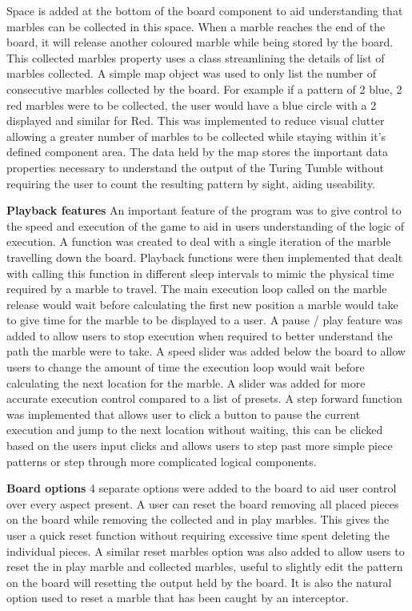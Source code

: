 \documentclass{l4proj}
\begin{document}
Space is added at the bottom of the board component to aid understanding that marbles can be collected in this space. When a marble reaches the end of the board, it will release another coloured marble while being stored by the board. This collected marbles property uses a class streamlining the details of list of marbles collected. A simple map object was used to only list the number of consecutive marbles collected by the board. For example if a pattern of 2 blue, 2 red marbles were to be collected, the user would have a blue circle with a 2 displayed and similar for Red. This was implemented to reduce visual clutter allowing a greater number of marbles to be collected while staying within it's defined component area. The data held by the map stores the important data properties necessary to understand the output of the Turing Tumble without requiring the user to count the resulting pattern by sight, aiding useability.   

\textbf{Playback features}
An important feature of the program was to give control to the speed and execution of the game to aid in users understanding of the logic of execution. A function was created to deal with a single iteration of the marble travelling down the board. Playback functions were then implemented that dealt with calling this function in different sleep intervals to mimic the physical time required by a marble to travel. The main execution loop called on the marble release would wait before calculating the first new position a marble would take to give time for the marble to be displayed to a user. A pause / play feature was added to allow users to stop execution when required to better understand the path the marble were to take. A speed slider was added below the board to allow users to change the amount of time the execution loop would wait before calculating the next location for the marble. A slider was added for more accurate execution control compared to a list of presets. A step forward function was implemented that allows user to click a button to pause the current execution and jump to the next location without waiting, this can be clicked based on the users input clicks and allows users to step past more simple piece patterns or step through more complicated logical components. 

\textbf{Board options}
4 separate options were added to the board to aid user control over every aspect present. A user can reset the board removing all placed pieces on the board while removing the collected and in play marbles. This gives the user a quick reset function without requiring excessive time spent deleting the individual pieces. A similar reset marbles option was also added to allow users to reset the in play marble and collected marbles, useful to slightly edit the pattern on the board will resetting the output held by the board. It is also the natural option used to reset a marble that has been caught by an interceptor.
\end{document}
